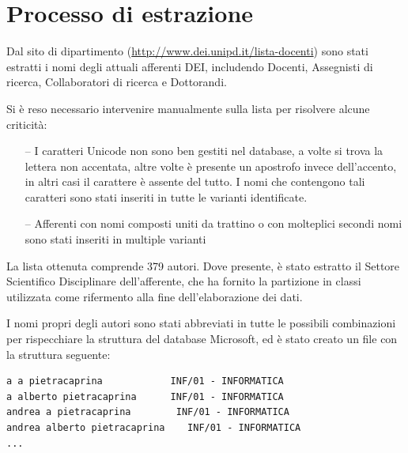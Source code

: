 \documentclass[12pt,a4paper,twoside]{report}
\begin{document}
\section{Processo di estrazione} \label{sec:processo}

Dal sito di dipartimento (\url{http://www.dei.unipd.it/lista-docenti}) sono stati estratti i nomi
degli attuali afferenti DEI, includendo Docenti, Assegnisti di ricerca, Collaboratori di ricerca e
Dottorandi.

Si è reso necessario intervenire manualmente sulla lista per risolvere alcune criticità:
\begin{itemize}
\item[--]
    I caratteri Unicode non sono ben gestiti nel database, a volte si trova la lettera non
        accentata, altre volte è presente un apostrofo invece dell'accento, in altri casi il
        carattere è assente del tutto. I nomi che contengono tali caratteri sono stati inseriti in
        tutte le varianti identificate.
\item[--]
    Afferenti con nomi composti uniti da trattino o con molteplici secondi nomi sono stati inseriti
        in multiple varianti
\end{itemize}

La lista ottenuta comprende 379 autori.
Dove presente, è stato estratto il Settore Scientifico Disciplinare dell'afferente, che ha fornito
la partizione in classi utilizzata come rifermento alla fine dell'elaborazione dei dati.

I nomi propri degli autori sono stati abbreviati in tutte le possibili combinazioni per rispecchiare
la struttura del database Microsoft, ed è stato creato un file con la struttura seguente:

\begin{center}
\begin{minipage}{0.90\textwidth}
\begin{verbatim}
a a pietracaprina            INF/01 - INFORMATICA
a alberto pietracaprina	     INF/01 - INFORMATICA
andrea a pietracaprina	      INF/01 - INFORMATICA
andrea alberto pietracaprina	INF/01 - INFORMATICA
...

\end{verbatim}
\end{minipage}
\end{center}
\end{document}
